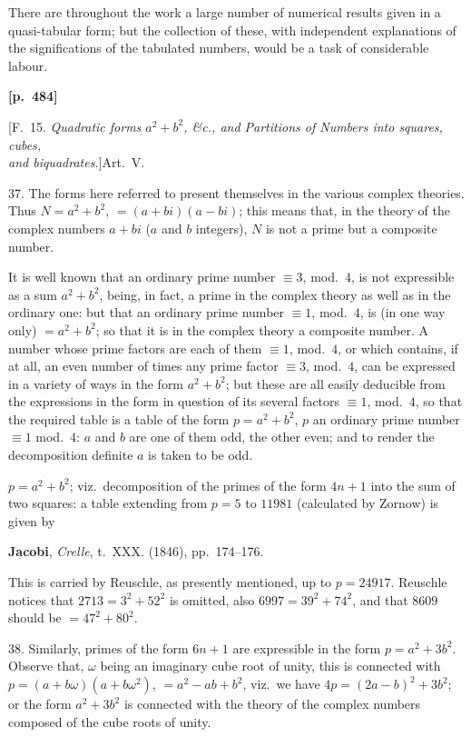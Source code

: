 \documentclass[11pt,a4paper]{article}
\begin{document}
There are throughout the work a large number of numerical results given in a quasi-tabular form; but the collection of these, with independent explanations of the significations of the tabulated numbers, would be a task of considerable labour.

\bigskip
\noindent\textbf{[p.~484]}
\begin{center}
[F.~15. \textit{Quadratic forms $a^{2} + b^{2}$, \&c., and Partitions of Numbers into squares, cubes,\\ and biquadrates.}]\quad Art.~V.
\end{center}

37. The forms here referred to present themselves in the various complex theories. Thus $N = a^{2} + b^{2}$, $= (a + bi)(a - bi)$; this means that, in the theory of the complex numbers $a + bi$ ($a$ and $b$ integers), $N$ is not a prime but a composite number.

It is well known that an ordinary prime number $\equiv 3$, mod.~$4$, is not expressible as a sum $a^{2} + b^{2}$, being, in fact, a prime in the complex theory as well as in the ordinary one: but that an ordinary prime number $\equiv 1$, mod.~$4$, is (in one way only) $= a^{2} + b^{2}$; so that it is in the complex theory a composite number. A number whose prime factors are each of them $\equiv 1$, mod.~$4$, or which contains, if at all, an even number of times any prime factor $\equiv 3$, mod.~$4$, can be expressed in a variety of ways in the form $a^{2} + b^{2}$; but these are all easily deducible from the expressions in the form in question of its several factors $\equiv 1$, mod.~$4$, so that the required table is a table of the form $p = a^{2} + b^{2}$, $p$ an ordinary prime number $\equiv 1$ mod.~$4$: $a$ and $b$ are one of them odd, the other even; and to render the decomposition definite $a$ is taken to be odd.

$p = a^{2} + b^{2}$; viz.\ decomposition of the primes of the form $4n + 1$ into the sum of two squares: a table extending from $p = 5$ to $11981$ (calculated by Zornow) is given by

\textbf{Jacobi}, \textit{Crelle}, t.~XXX. (1846), pp.~174--176.

This is carried by Reuschle, as presently mentioned, up to $p = 24917$. Reuschle notices that $2713 = 3^{2} + 52^{2}$ is omitted, also $6997 = 39^{2} + 74^{2}$, and that $8609$ should be $= 47^{2} + 80^{2}$.

38. Similarly, primes of the form $6n + 1$ are expressible in the form $p = a^{2} + 3b^{2}$. Observe that, $\omega$ being an imaginary cube root of unity, this is connected with $p = (a + b\omega)(a + b\omega^{2})$, $= a^{2} - ab + b^{2}$, viz.\ we have $4p = (2a - b)^{2} + 3b^{2}$; or the form $a^{2} + 3b^{2}$ is connected with the theory of the complex numbers composed of the cube roots of unity.
\end{document}
